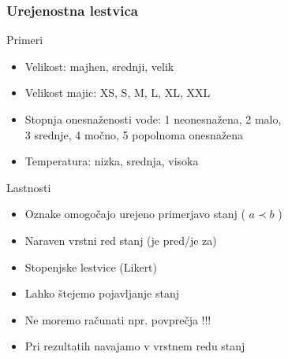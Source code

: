\begin{frame}[fragile]
\frametitle{Urejenostna lestvica}
\begin{block}{Primeri}

\begin{itemize}
  \item Velikost: majhen, srednji, velik
  \item Velikost majic: XS, S, M, L, XL, XXL
  \item Stopnja onesnaženosti vode: 1 neonesnažena, 2 malo,\\3 srednje, 4 močno, 5 popolnoma onesnažena 
  \item Temperatura: nizka, srednja, visoka
\end{itemize}
\end{block}
\begin{block}{Lastnosti}

\begin{itemize}
  \item Oznake omogočajo urejeno primerjavo stanj ( $a \prec b$ )
  \item Naraven vrstni red stanj (je pred/je za)
  \item Stopenjske lestvice (Likert)
  \item Lahko štejemo pojavljanje stanj
  \item Ne moremo računati npr. povprečja !!!
  \item Pri rezultatih navajamo v vrstnem redu stanj
  \end{itemize}
\end{block}

\end{frame}



